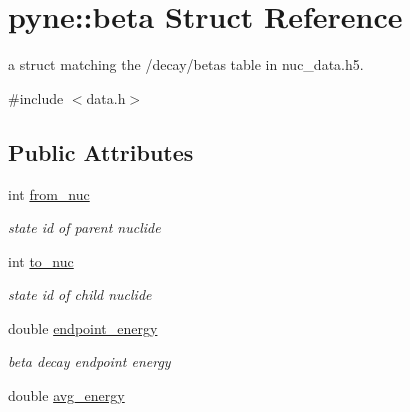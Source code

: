 \hypertarget{structpyne_1_1beta}{}\section{pyne\+:\+:beta Struct Reference}
\label{structpyne_1_1beta}


a struct matching the \textquotesingle{}/decay/betas\textquotesingle{} table in nuc\+\_\+data.\+h5.  




{\ttfamily \#include $<$data.\+h$>$}

\subsection*{Public Attributes}
\begin{DoxyCompactItemize}
\item 
int \hyperlink{structpyne_1_1beta_ad312f7cc9b8f0096aa1b797f28e10390}{from\+\_\+nuc}\hypertarget{structpyne_1_1beta_ad312f7cc9b8f0096aa1b797f28e10390}{}\label{structpyne_1_1beta_ad312f7cc9b8f0096aa1b797f28e10390}

\begin{DoxyCompactList}\small\item\em state id of parent nuclide \end{DoxyCompactList}\item 
int \hyperlink{structpyne_1_1beta_a359665983e92b3d729c6996faae54a18}{to\+\_\+nuc}\hypertarget{structpyne_1_1beta_a359665983e92b3d729c6996faae54a18}{}\label{structpyne_1_1beta_a359665983e92b3d729c6996faae54a18}

\begin{DoxyCompactList}\small\item\em state id of child nuclide \end{DoxyCompactList}\item 
double \hyperlink{structpyne_1_1beta_a1d23daf403d723e17a21070ebba1aa4f}{endpoint\+\_\+energy}\hypertarget{structpyne_1_1beta_a1d23daf403d723e17a21070ebba1aa4f}{}\label{structpyne_1_1beta_a1d23daf403d723e17a21070ebba1aa4f}

\begin{DoxyCompactList}\small\item\em beta decay endpoint energy \end{DoxyCompactList}\item 
double \hyperlink{structpyne_1_1beta_aef1da93efa75bfbb8c77604b8c24ba04}{avg\+\_\+energy}\hypertarget{structpyne_1_1beta_aef1da93efa75bfbb8c77604b8c24ba04}{}\label{structpyne_1_1beta_aef1da93efa75bfbb8c77604b8c24ba04}


\end{DoxyCompactItemize}
